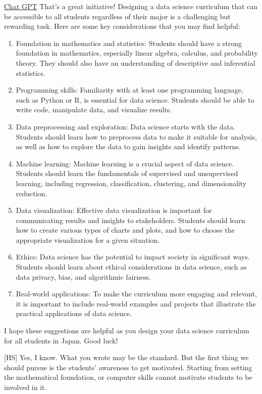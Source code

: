 \documentclass[
]{bxjsbook}
\providecommand{\tightlist}{%
  \setlength{\itemsep}{0pt}\setlength{\parskip}{0pt}}
\theoremstyle{definition}
\theoremstyle{definition}
\theoremstyle{definition}
\theoremstyle{definition}
\theoremstyle{remark}
\begin{document}
\protect\hyperlink{chatgpt}{Chat GPT} That's a great initiative! Designing a data science curriculum that can be accessible to all students regardless of their major is a challenging but rewarding task. Here are some key considerations that you may find helpful:

\begin{enumerate}
\def\labelenumi{\arabic{enumi}.}
\tightlist
\item
  Foundation in mathematics and statistics: Students should have a strong foundation in mathematics, especially linear algebra, calculus, and probability theory. They should also have an understanding of descriptive and inferential statistics.
\item
  Programming skills: Familiarity with at least one programming language, such as Python or R, is essential for data science. Students should be able to write code, manipulate data, and visualize results.
\item
  Data preprocessing and exploration: Data science starts with the data. Students should learn how to preprocess data to make it suitable for analysis, as well as how to explore the data to gain insights and identify patterns.
\item
  Machine learning: Machine learning is a crucial aspect of data science. Students should learn the fundamentals of supervised and unsupervised learning, including regression, classification, clustering, and dimensionality reduction.
\item
  Data visualization: Effective data visualization is important for communicating results and insights to stakeholders. Students should learn how to create various types of charts and plots, and how to choose the appropriate visualization for a given situation.
\item
  Ethics: Data science has the potential to impact society in significant ways. Students should learn about ethical considerations in data science, such as data privacy, bias, and algorithmic fairness.
\item
  Real-world applications: To make the curriculum more engaging and relevant, it is important to include real-world examples and projects that illustrate the practical applications of data science.
\end{enumerate}

I hope these suggestions are helpful as you design your data science curriculum for all students in Japan. Good luck!

{[}HS{]} Yes, I know. What you wrote may be the standard. But the first thing we should pursue is the students' awareness to get motivated. Starting from setting the mathematical foundation, or computer skills cannot motivate students to be involved in it.
\end{document}
